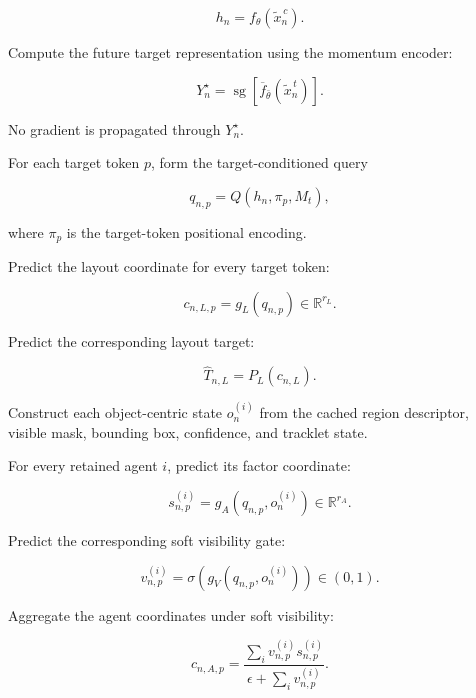\begin{tcolorbox}
\begin{algsteps}
\[
h_n
=
f_\theta
\left(
\widetilde x_n^{\,c}
\right).
\]

\item
Compute the future target representation using the momentum encoder:

\[
Y_n^\star
=
\operatorname{sg}
\left[
\overline f_{\bar\theta}
\left(
\widetilde x_n^{\,t}
\right)
\right].
\]

No gradient is propagated through \(Y_n^\star\).

\item
For each target token \(p\), form the target-conditioned query

\[
q_{n,p}
=
Q(h_n,\pi_p,M_t),
\]

where \(\pi_p\) is the target-token positional encoding.


\item
Predict the layout coordinate for every target token:

\[
c_{n,L,p}
=
g_L(q_{n,p})
\in\mathbb R^{r_L}.
\]

\item
Predict the corresponding layout target:

\[
\widehat T_{n,L}
=
P_L(c_{n,L}).
\]


\item
Construct each object-centric state \(o_n^{(i)}\) from the cached
region descriptor, visible mask, bounding box, confidence, and
tracklet state.

\item
For every retained agent \(i\), predict its factor coordinate:

\[
s_{n,p}^{(i)}
=
g_A
\left(
q_{n,p},o_n^{(i)}
\right)
\in\mathbb R^{r_A}.
\]

\item
Predict the corresponding soft visibility gate:

\[
v_{n,p}^{(i)}
=
\sigma
\left(
g_V
\left(
q_{n,p},o_n^{(i)}
\right)
\right)
\in(0,1).
\]

\item
Aggregate the agent coordinates under soft visibility:

\[
c_{n,A,p}
=
\frac{
\sum_i
v_{n,p}^{(i)}s_{n,p}^{(i)}
}{
\epsilon+
\sum_i v_{n,p}^{(i)}
}.
\]


\end{algsteps}
\end{tcolorbox}
